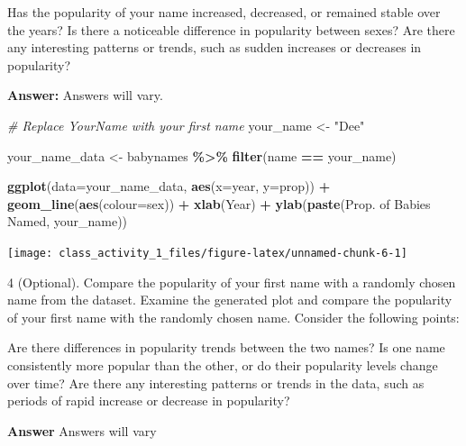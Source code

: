 \documentclass[
]{book}
\newenvironment{Shaded}{\begin{snugshade}}{\end{snugshade}}
\newcommand{\AttributeTok}[1]{\textcolor[rgb]{0.13,0.29,0.53}{#1}}
\newcommand{\CommentTok}[1]{\textcolor[rgb]{0.56,0.35,0.01}{\textit{#1}}}
\newcommand{\FunctionTok}[1]{\textcolor[rgb]{0.13,0.29,0.53}{\textbf{#1}}}
\newcommand{\NormalTok}[1]{#1}
\newcommand{\OtherTok}[1]{\textcolor[rgb]{0.56,0.35,0.01}{#1}}
\newcommand{\SpecialCharTok}[1]{\textcolor[rgb]{0.81,0.36,0.00}{\textbf{#1}}}
\newcommand{\StringTok}[1]{\textcolor[rgb]{0.31,0.60,0.02}{#1}}
\begin{document}
Has the popularity of your name increased, decreased, or remained stable over the years? Is there a noticeable difference in popularity between sexes? Are there any interesting patterns or trends, such as sudden increases or decreases in popularity?

\textbf{Answer:} Answers will vary.

\vspace*{0.2in}

\begin{Shaded}
\begin{Highlighting}[]
\CommentTok{\# Replace \textquotesingle{}YourName\textquotesingle{} with your first name}
\NormalTok{your\_name }\OtherTok{\textless{}{-}} \StringTok{"Dee"}

\NormalTok{your\_name\_data }\OtherTok{\textless{}{-}}\NormalTok{ babynames }\SpecialCharTok{\%\textgreater{}\%} \FunctionTok{filter}\NormalTok{(name }\SpecialCharTok{==}\NormalTok{ your\_name)}

\FunctionTok{ggplot}\NormalTok{(}\AttributeTok{data=}\NormalTok{your\_name\_data, }\FunctionTok{aes}\NormalTok{(}\AttributeTok{x=}\NormalTok{year, }\AttributeTok{y=}\NormalTok{prop)) }\SpecialCharTok{+} 
  \FunctionTok{geom\_line}\NormalTok{(}\FunctionTok{aes}\NormalTok{(}\AttributeTok{colour=}\NormalTok{sex)) }\SpecialCharTok{+} 
  \FunctionTok{xlab}\NormalTok{(}\StringTok{\textquotesingle{}Year\textquotesingle{}}\NormalTok{) }\SpecialCharTok{+} 
  \FunctionTok{ylab}\NormalTok{(}\FunctionTok{paste}\NormalTok{(}\StringTok{\textquotesingle{}Prop. of Babies Named\textquotesingle{}}\NormalTok{, your\_name))}
\end{Highlighting}
\end{Shaded}

\texttt{[image: class\_activity\_1\_files/figure-latex/unnamed-chunk-6-1]}

4 (Optional). Compare the popularity of your first name with a randomly chosen name from the dataset. Examine the generated plot and compare the popularity of your first name with the randomly chosen name. Consider the following points:

Are there differences in popularity trends between the two names? Is one name consistently more popular than the other, or do their popularity levels change over time? Are there any interesting patterns or trends in the data, such as periods of rapid increase or decrease in popularity?

\textbf{Answer} Answers will vary

\vspace*{0.2in}
\end{document}
